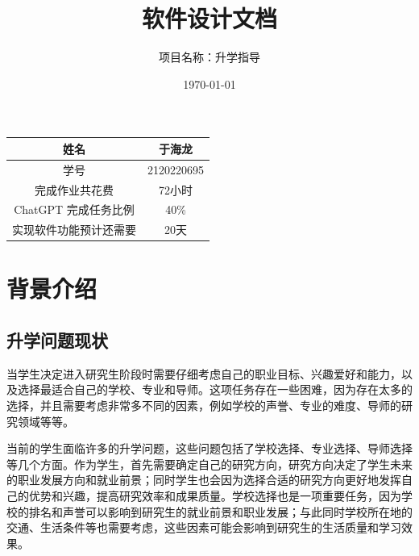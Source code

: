 \documentclass[UTF8]{ctexart}
\title{软件设计文档}
\author{项目名称：升学指导}
\date{\today}
\newcommand{\m}[1]{\textcolor{modify}{#1}}
\begin{document}
    \maketitle

    \begin{center}
        \begin{tabular}{|c|c|}
            \hline
            姓名 & 于海龙 \\	
            \hline
            学号 & 2120220695 \\	
            \hline
            完成作业共花费&72小时\\
            \hline
            ChatGPT 完成任务比例&40\%\\
            \hline
            实现软件功能预计还需要&20天\\
            \hline
        \end{tabular}

        \par
    \end{center}

    

    \newpage
    \tableofcontents
    \newpage
    
    \section{背景介绍}
    \subsection{升学问题现状}
    \par
    \m{当学生决定进入研究生阶段时需要仔细考虑自己的职业目标、兴趣爱好和能力，以及选择最适合自己的学校、专业和导师}。这项任务存在一些困难，因为存在太多的选择，并且需要考虑非常多不同的因素，例如学校的声誉、专业的难度、导师的研究领域等等。
    
    \par
    当前的学生面临许多的升学问题，这些问题包括了学校选择、专业选择、导师选择等几个方面。作为学生，首先需要确定自己的研究方向，\m{研究方向决定了学生未来的职业发展方向和就业前景}；\m{同时学生也会因为选择合适的研究方向更好地发挥自己的优势和兴趣，提高研究效率和成果质量}。学校选择也是一项重要任务，因为\m{学校的排名和声誉可以影响到研究生的就业前景和职业发展}；与此同时\m{学校所在地的交通、生活条件等也需要考虑，这些因素可能会影响到研究生的生活质量和学习效果}。
\end{document}
